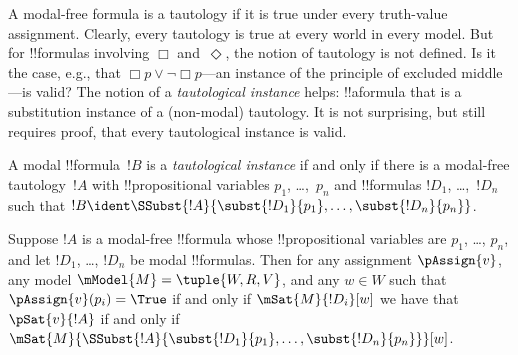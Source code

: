 \documentclass[../../../include/open-logic-section]{subfiles}
\begin{document}


\begin{explain}
A modal-free formula is a tautology if it is true under every
truth-value assignment. Clearly, every tautology is true at every
world in every model. But for !!{formula}s involving $\Box$
and~$\Diamond$, the notion of tautology is not defined. Is it the
case, e.g., that $\Box p \lor \lnot \Box p$---an instance of the
principle of excluded middle---is valid? The notion of a
\emph{tautological instance} helps: !!a{formula} that is a
substitution instance of a (non-modal) tautology. It is not
surprising, but still requires proof, that every tautological instance
is valid.
\end{explain}

\begin{defn}
  A modal !!{formula}~$!B$ is a \emph{tautological instance} if and
  only if there is a modal-free tautology~$!A$ with !!{propositional
    variable}s $p_1$, \dots,~$p_n$ and !!{formula}s $!D_1$,
  \dots,~$!D_n$ such that $!B \ident \SSubst{!A}{\subst{!D_1}{p_1},
    \dots, \subst{!D_n}{p_n}}$.
\end{defn}

\begin{lem}
  Suppose $!A$ is a modal-free !!{formula} whose !!{propositional
  variable}s are $p_1$, \dots, $p_n$, and let $!D_1$, \dots,
  $!D_n$ be modal !!{formula}s. Then for any assignment $\pAssign{v}$,
  any model $\mModel{M} = \tuple{W, R, V}$, and any $w \in W$ such
  that $\pAssign{v}(p_i) = \True$ if and only if $\mSat{M}{!D_i}[w]$ we have
  that $\pSat{v}{!A}$ if and only if
  $\mSat{M}{\SSubst{!A}{\subst{!D_1}{p_1}, \dots,
      \subst{!D_n}{p_n}}}[w]$.
\end{lem}
\end{document}
